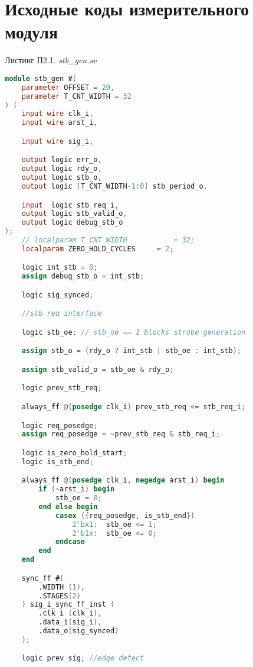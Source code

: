 \chapter{Исходные коды измерительного модуля}\label{appendix-MikTeX-TexStudio}							%

\begin{flushright}
Листинг П2.1. \emph{stb\_gen.sv}
\end{flushright}

\begin{lstlisting}[language=Verilog]
module stb_gen #(
	parameter OFFSET = 20,
	parameter T_CNT_WIDTH = 32
) (
	input wire clk_i,
	input wire arst_i,

	input wire sig_i,

	output logic err_o,
	output logic rdy_o,
	output logic stb_o,
	output logic [T_CNT_WIDTH-1:0] stb_period_o,

	input  logic stb_req_i,
	output logic stb_valid_o,
	output logic debug_stb_o
);
	// localparam T_CNT_WIDTH 			= 32;
	localparam ZERO_HOLD_CYCLES 	= 2;

	logic int_stb = 0;
	assign debug_stb_o = int_stb;

	logic sig_synced;

	//stb req interface

	logic stb_oe; // stb_oe == 1 blocks strobe generation

	assign stb_o = (rdy_o ? int_stb | stb_oe : int_stb);	

	assign stb_valid_o = stb_oe & rdy_o;

	logic prev_stb_req;

	always_ff @(posedge clk_i) prev_stb_req <= stb_req_i;

	logic req_posedge;
	assign req_posedge = ~prev_stb_req & stb_req_i;

	logic is_zero_hold_start;
	logic is_stb_end;

	always_ff @(posedge clk_i, negedge arst_i) begin
		if (~arst_i) begin
			stb_oe = 0;
		end else begin
			casex ({req_posedge, is_stb_end})			
				2'bx1:  stb_oe <= 1;
				2'b1x:	stb_oe <= 0;
			endcase
		end
	end

	sync_ff #(
		.WIDTH (1),
		.STAGES(2)
	) sig_i_sync_ff_inst (
		.clk_i (clk_i),
		.data_i(sig_i),
		.data_o(sig_synced)
	);

	logic prev_sig; //edge detect


\end{lstlisting}
